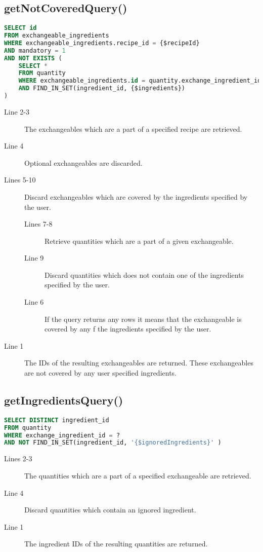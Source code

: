 \subsection*{getNotCoveredQuery()}
\begin{lstlisting}[language=SQL, morekeywords={FIND_IN_SET}, float=h, label={}, caption={Query to find the exchangeables that are not covered.}]
SELECT id
FROM exchangeable_ingredients
WHERE exchangeable_ingredients.recipe_id = {$recipeId}
AND mandatory = 1
AND NOT EXISTS (
    SELECT * 
    FROM quantity
    WHERE exchangeable_ingredients.id = quantity.exchange_ingredient_id
    AND FIND_IN_SET(ingredient_id, {$ingredients})
)
\end{lstlisting}
\begin{description}
\item[Line 2-3] The exchangeables which are a part of a specified recipe are retrieved.
\item[Line 4] Optional exchangeables are discarded.
\item[Lines 5-10] Discard exchangeables which are covered by the ingredients specified by the user.
	\begin{description}
	\item[Lines 7-8] Retrieve quantities which are a part of a given exchangeable.
	\item[Line 9] Discard quantities which does not contain one of the ingredients specified by the user.
	\item[Line 6] If the query returns any rows it means that the exchangeable is covered by any f the ingredients specified by the user.
	\end{description}
\item[Line 1] The IDs of the resulting exchangeables are returned. These exchangeables are not covered by any user specified ingredients.
\end{description}



\subsection*{getIngredientsQuery()}
\begin{lstlisting}[language=SQL, morekeywords={FIND_IN_SET}, float=h, label={}, caption={Query to get the ingredient of an exchangeable, excluding ignored ingredients.}]
SELECT DISTINCT ingredient_id
FROM quantity
WHERE exchange_ingredient_id = ?
AND NOT FIND_IN_SET(ingredient_id, '{$ignoredIngredients}' )
\end{lstlisting}
\begin{description}
\item[Lines 2-3] The quantities which are a part of a specified exchangeable are retrieved.
\item[Line 4] Discard quantities which contain an ignored ingredient.
\item[Line 1] The ingredient IDs of the resulting quantities are returned.
\end{description}







